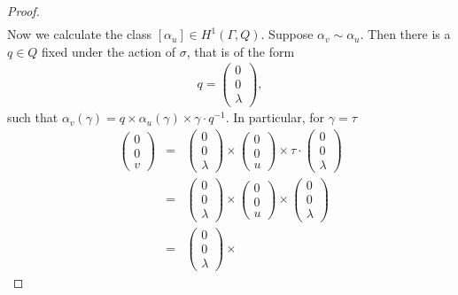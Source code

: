\begin{proof}
\begin{eqnarray*}
	\end{eqnarray*}
	Now we calculate the class $[\alpha_u] \in H^1(\Gamma, Q)$. Suppose $\alpha_v\sim\alpha_u$. Then
	there is a $q\in Q$ fixed under the action of $\sigma$, that is of the form
	\begin{eqnarray*}
		q = \left(\begin{matrix} 0 \\ 0 \\ \lambda\end{matrix}\right),
	\end{eqnarray*}
	such that $\alpha_v(\gamma) = q\times\alpha_u(\gamma)\times\gamma\cdot q^{-1}$. In particular, for $\gamma = \tau$
	\begin{eqnarray*}
		\left(\begin{matrix} 0 \\ 0 \\ v\end{matrix}\right) &=&
		\left(\begin{matrix} 0 \\ 0 \\ \lambda\end{matrix}\right) \times
		\left(\begin{matrix} 0 \\ 0 \\ u\end{matrix}\right) \times
		\tau\cdot\left(\begin{matrix} 0 \\ 0 \\ \lambda\end{matrix}\right)\\
		&=&
		\left(\begin{matrix} 0 \\ 0 \\ \lambda\end{matrix}\right) \times
		\left(\begin{matrix} 0 \\ 0 \\ u\end{matrix}\right) \times
		\left(\begin{matrix} 0 \\ 0 \\ \lambda\end{matrix}\right)\\
		&=&
		\left(\begin{matrix} 0 \\ 0 \\ \lambda\end{matrix}\right) \times

\end{eqnarray*}
\end{proof}
